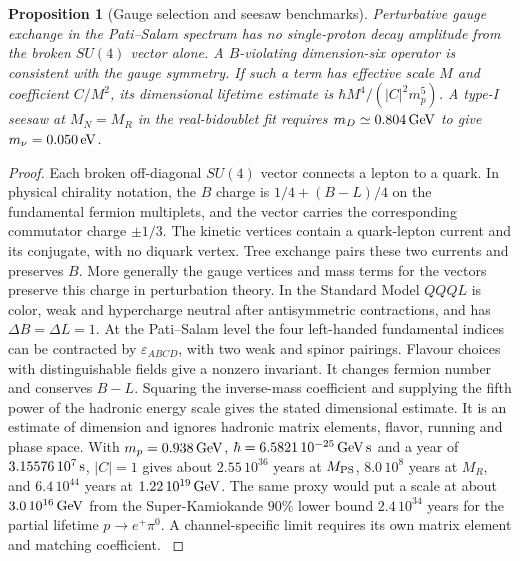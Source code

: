 \documentclass[aps,pra,onecolumn,superscriptaddress,nofootinbib,10pt]{revtex4-2}
\newtheorem{proposition}[theorem]{Proposition}
\theoremstyle{definition}
\theoremstyle{remark}
\begin{document}
\begin{proposition}[Gauge selection and seesaw benchmarks]\label{ub:decay}
Perturbative gauge exchange in the Pati--Salam spectrum has no
single-proton decay amplitude from the broken $SU(4)$ vector alone.
A $B$-violating dimension-six operator is consistent with the
gauge symmetry. If such a term has effective scale $M$ and coefficient
$C/M^2$, its dimensional lifetime estimate is
$\hbar M^4/(|C|^2m_p^5)$. A type-I seesaw at $M_N=M_R$ in the real-bidoublet
fit requires $m_D\simeq0.804\,{\rm GeV}$ to give $m_\nu=0.050\,{\rm eV}$.
\end{proposition}
\begin{proof}
Each broken off-diagonal $SU(4)$ vector connects a lepton to a quark.
In physical chirality notation, the $B$ charge is $1/4+(B-L)/4$ on
the fundamental fermion multiplets, and the vector carries the
corresponding commutator charge $\pm1/3$. The kinetic vertices contain
a quark-lepton current and its conjugate, with no diquark vertex.
Tree exchange pairs these two currents and preserves $B$.
More generally the gauge vertices and mass terms for the vectors
preserve this charge in perturbation theory. In the Standard Model
$QQQL$ is color, weak and hypercharge neutral after antisymmetric
contractions, and has $\Delta B=\Delta L=1$. At the Pati--Salam level
the four left-handed fundamental indices can be contracted by
$\varepsilon_{ABCD}$, with two weak and spinor pairings. Flavour
choices with distinguishable fields give a nonzero invariant. It changes
fermion number and conserves $B-L$.
Squaring the inverse-mass coefficient and supplying the fifth power of
the hadronic energy scale gives the stated dimensional estimate. It is
an estimate of dimension and ignores hadronic matrix elements, flavor,
running and phase space. With $m_p=0.938\,{\rm GeV}$,
$\hbar=6.5821\,10^{-25}\,{\rm GeV\,s}$ and a year of
$3.15576\,10^7\,{\rm s}$, $|C|=1$ gives about $2.55\,10^{36}$ years at
$M_{\rm PS}$, $8.0\,10^8$ years at $M_R$, and $6.4\,10^{44}$ years
at $1.22\,10^{19}\,{\rm GeV}$. The same proxy would put a scale at
about $3.0\,10^{16}\,{\rm GeV}$ from the Super-Kamiokande
$90\%$ lower bound $2.4\,10^{34}$ years for the partial lifetime
$p\to e^+\pi^0$. A channel-specific limit requires its own matrix element
and matching coefficient. \cite{ub:takenaka}


\end{proof}
\end{document}
